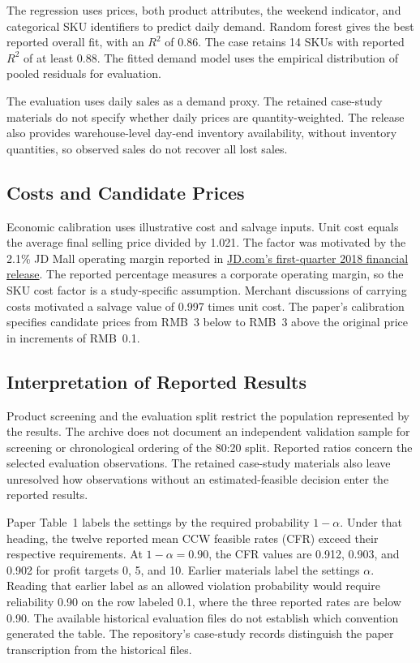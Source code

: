 The regression uses prices, both product attributes, the weekend indicator, and categorical SKU identifiers to predict daily demand. Random forest gives the best reported overall fit, with an \(R^2\) of 0.86. The case retains 14 SKUs with reported \(R^2\) of at least 0.88. The fitted demand model uses the empirical distribution of pooled residuals for evaluation.

The evaluation uses daily sales as a demand proxy. The retained case-study materials do not specify whether daily prices are quantity-weighted. The release also provides warehouse-level day-end inventory availability, without inventory quantities, so observed sales do not recover all lost sales.

\subsection{Costs and Candidate Prices}\label{app::caseParam}

Economic calibration uses illustrative cost and salvage inputs. Unit cost equals the average final selling price divided by 1.021. The factor was motivated by the 2.1\% JD Mall operating margin reported in \href{https://ir.jd.com/news-releases/news-release-details/jdcom-announces-first-quarter-2018-results}{JD.com's first-quarter 2018 financial release}. The reported percentage measures a corporate operating margin, so the SKU cost factor is a study-specific assumption. Merchant discussions of carrying costs motivated a salvage value of 0.997 times unit cost. The paper's calibration specifies candidate prices from RMB~3 below to RMB~3 above the original price in increments of RMB~0.1.

\subsection{Interpretation of Reported Results}

Product screening and the evaluation split restrict the population represented by the results. The archive does not document an independent validation sample for screening or chronological ordering of the 80:20 split. Reported ratios concern the selected evaluation observations. The retained case-study materials also leave unresolved how observations without an estimated-feasible decision enter the reported results.

Paper Table~1 labels the settings by the required probability \(1-\alpha\). Under that heading, the twelve reported mean CCW feasible rates (CFR) exceed their respective requirements. At \(1-\alpha=0.90\), the CFR values are 0.912, 0.903, and 0.902 for profit targets 0, 5, and 10. Earlier materials label the settings \(\alpha\). Reading that earlier label as an allowed violation probability would require reliability 0.90 on the row labeled 0.1, where the three reported rates are below 0.90. The available historical evaluation files do not establish which convention generated the table. The repository's case-study records distinguish the paper transcription from the historical files.

